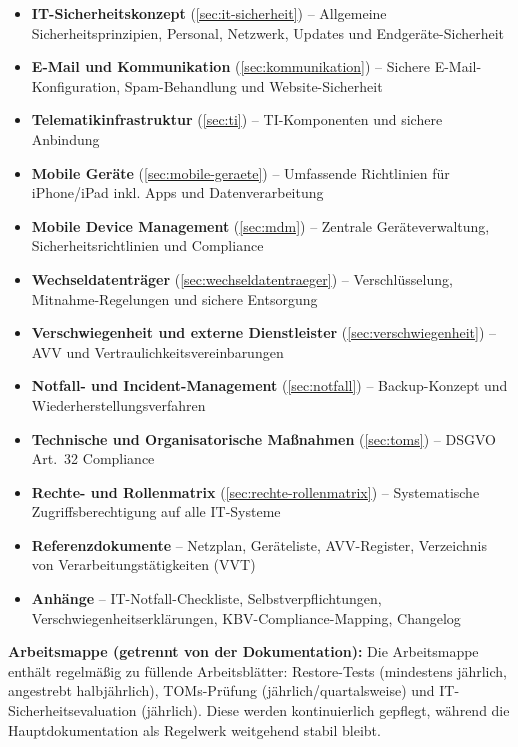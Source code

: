 \begin{itemize}
  \item \textbf{IT-Sicherheitskonzept} (\cref{sec:it-sicherheit}) -- Allgemeine
    Sicherheitsprinzipien, Personal, Netzwerk, Updates und Endgeräte-Sicherheit
  \item \textbf{E-Mail und Kommunikation} (\cref{sec:kommunikation}) -- Sichere
    E-Mail-Konfiguration, Spam-Behandlung und Website-Sicherheit
  \item \textbf{Telematikinfrastruktur} (\cref{sec:ti}) -- TI-Komponenten und
    sichere Anbindung
  \item \textbf{Mobile Geräte} (\cref{sec:mobile-geraete}) -- Umfassende
    Richtlinien für iPhone/iPad inkl. Apps und Datenverarbeitung
  \item \textbf{Mobile Device Management} (\cref{sec:mdm}) -- Zentrale
    Geräteverwaltung, Sicherheitsrichtlinien und Compliance
  \item \textbf{Wechseldatenträger} (\cref{sec:wechseldatentraeger}) --
    Verschlüsselung, Mitnahme-Regelungen und sichere Entsorgung
  \item \textbf{Verschwiegenheit und externe Dienstleister}
    (\cref{sec:verschwiegenheit}) -- AVV und Vertraulichkeitsvereinbarungen
  \item \textbf{Notfall- und Incident-Management} (\cref{sec:notfall}) --
    Backup-Konzept und Wiederherstellungsverfahren
  \item \textbf{Technische und Organisatorische Maßnahmen} (\cref{sec:toms}) --
    DSGVO Art.\ 32 Compliance
  \item \textbf{Rechte- und Rollenmatrix} (\cref{sec:rechte-rollenmatrix}) --
    Systematische Zugriffsberechtigung auf alle IT-Systeme
  \item \textbf{Referenzdokumente} -- Netzplan, Geräteliste, AVV-Register,
    Verzeichnis von Verarbeitungstätigkeiten (VVT)
  \item \textbf{Anhänge} -- IT-Notfall-Checkliste, Selbstverpflichtungen,
    Verschwiegenheitserklärungen, KBV-Compliance-Mapping, Changelog
\end{itemize}

\textbf{Arbeitsmappe (getrennt von der Dokumentation):} Die Arbeitsmappe enthält
regelmäßig zu füllende Arbeitsblätter: Restore-Tests (mindestens jährlich, angestrebt halbjährlich),
TOMs-Prüfung (jährlich/quartalsweise) und IT-Sicherheitsevaluation (jährlich).
Diese werden kontinuierlich gepflegt, während die Hauptdokumentation als
Regelwerk weitgehend stabil bleibt.

